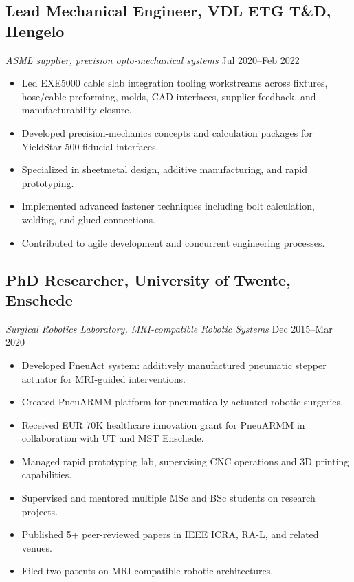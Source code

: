 \documentclass[11pt,a4paper]{article}
\begin{document}
\subsection{Lead Mechanical Engineer, VDL ETG T\&D, Hengelo}
{\small\textit{ASML supplier, precision opto-mechanical systems}} \hfill {\small Jul 2020--Feb 2022}
\begin{itemize}
 \item Led EXE5000 cable slab integration tooling workstreams across fixtures, hose/cable preforming, molds, CAD interfaces, supplier feedback, and manufacturability closure.
 \item Developed precision-mechanics concepts and calculation packages for YieldStar 500 fiducial interfaces.
 \item Specialized in sheetmetal design, additive manufacturing, and rapid prototyping.
 \item Implemented advanced fastener techniques including bolt calculation, welding, and glued connections.
 \item Contributed to agile development and concurrent engineering processes.
\end{itemize}

\subsection{PhD Researcher, University of Twente, Enschede}
{\small\textit{Surgical Robotics Laboratory, MRI-compatible Robotic Systems}} \hfill {\small Dec 2015--Mar 2020}
\begin{itemize}
 \item Developed PneuAct system: additively manufactured pneumatic stepper actuator for MRI-guided interventions.
 \item Created PneuARMM platform for pneumatically actuated robotic surgeries.
 \item Received EUR 70K healthcare innovation grant for PneuARMM in collaboration with UT and MST Enschede.
 \item Managed rapid prototyping lab, supervising CNC operations and 3D printing capabilities.
 \item Supervised and mentored multiple MSc and BSc students on research projects.
 \item Published 5+ peer-reviewed papers in IEEE ICRA, RA-L, and related venues.
 \item Filed two patents on MRI-compatible robotic architectures.
\end{itemize}
\end{document}
